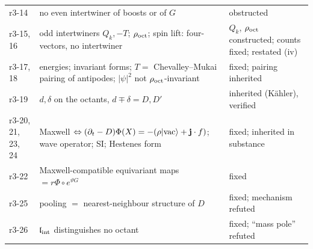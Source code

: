 {\begin{longtable}{@{}>{\raggedright\arraybackslash}p{}>{\raggedright\arraybackslash}p{}>{\raggedright\arraybackslash}p{}@{}}
r3-14 & no even intertwiner of boosts or of $G$ & obstructed\\
r3-15, 16 & odd intertwiners $Q_k,-T$; $\rho_{\rm oct}$; spin lift: four-vectors, no intertwiner & $Q_k$, $\rho_{\rm oct}$ constructed; counts fixed; restated (iv)\\
r3-17, 18 & energies; invariant forms; $T=$ Chevalley--Mukai pairing of antipodes; $|\psi|^2$ not $\rho_{\rm oct}$-invariant & fixed; pairing inherited\\
r3-19 & $d,\delta$ on the octants, $d\mp\delta=D,D'$ & inherited (K\"ahler), verified\\
r3-20, 21, 23, 24 & Maxwell $\Leftrightarrow(\partial_t-D)\Phi(X)=-(\rho|\mathrm{vac}\rangle+\mathbf j\cdot f)$; wave operator; SI; Hestenes form & fixed; inherited in substance\\
r3-22 & Maxwell-compatible equivariant maps $=r\Phi\circ e^{\vartheta G}$ & fixed\\
r3-25 & pooling $=$ nearest-neighbour structure of $D$ & fixed; mechanism refuted\\
r3-26 & $\mathfrak l_{\rm int}$ distinguishes no octant & fixed; ``mass pole'' refuted\\
\bottomrule
\end{longtable}}
